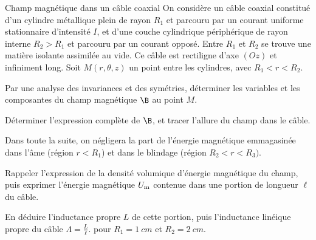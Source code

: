 \begin{exo}[PC][2]{Champ magnétique dans un câble coaxial}
On considère un câble coaxial constitué d'un cylindre métallique plein de rayon $R_1$ et parcouru par un courant uniforme stationnaire d’intensité $I$, et d'une couche cylindrique périphérique de rayon interne $R_2>R_1$ et parcouru par un courant opposé. Entre $R_1$ et $R_2$ se trouve une matière isolante assimilée au vide. Ce câble est rectiligne d'axe $(Oz)$ et infiniment long. Soit $M(r,\theta,z)$ un point entre les cylindres, avec $R_1<r<R_2$.

\begin{quest}
\item Par une analyse des invariances et des symétries, déterminer les variables et les composantes du champ magnétique $\B$ au point $M$.
\item Déterminer l'expression complète de $\B$, et tracer l'allure du champ dans le câble.
\end{quest}

Dans toute la suite, on négligera la part de l'énergie magnétique emmagasinée dans l'âme (région $r<R_1$) et dans le blindage (région $R_2<r<R_3)$.
\begin{quest}
\item  Rappeler l'expression de la densité volumique d'énergie magnétique du champ, puis exprimer l'énergie magnétique $U_{\rm{m}}$ contenue dans une portion de longueur $\ell$ du câble.
\item En déduire l’inductance propre $L$ de cette portion, puis l'inductance linéique propre du câble $\Lambda = \frac{L}{\ell}$. \AN pour $R_1 = \SI{1}{cm}$ et $R_2 = \SI{2}{cm}$.
\end{quest}
\end{exo}
